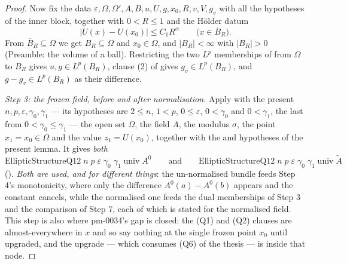 \begin{proof}
Now fix the data $\varepsilon,\Omega,\Omega',A,B,u,U,g,x_0,R,v,V,g_v$ with all
the hypotheses of the inner block, together with $0<R\le1$ and the H\"older
datum
\[
|U(x)-U(x_0)|\le C_1R^{\alpha}\qquad\bigl(x\in\overline B_R\bigr).
\tag{9.2}
\]
From $\overline B_R\subseteq\Omega$ we get $B_R\subseteq\Omega$ and
$x_0\in\Omega$, and $|B_R|<\infty$ with $|B_R|>0$ (Preamble: the volume of a
ball).  Restricting the two $L^p$ memberships of  from
$\Omega$ to $B_R$ gives $u,g\in L^p(B_R)$, clause (2) of
 gives $g_v\in L^p(B_R)$, and $g-g_v\in L^p(B_R)$ as
their difference.

\medskip
\noindent\emph{Step 3: the frozen field, before and after normalisation.}
Apply  with the present
$n,p,\varepsilon,\gamma_0,\gamma_1$ --- its hypotheses are $2\le n$, $1<p$,
$0\le\varepsilon$, $0<\gamma_0$ and $0<\gamma_1$, the last from
$0<\gamma_0\le\gamma_1$ --- the open set $\Omega$, the field $A$, the modulus
$\sigma$, the point $x_1=x_0\in\Omega$ and the value $z_1=U(x_0)$, together with
the  and  hypotheses
of the present lemma.  It gives \emph{both}
\[
\mathrm{EllipticStructureQ12}\;n\;p\;\varepsilon\;\gamma_0\;\gamma_1\;
\mathrm{univ}\;A^0
\qquad\text{and}\qquad
\mathrm{EllipticStructureQ12}\;n\;p\;\varepsilon\;\gamma_0\;\gamma_1\;
\mathrm{univ}\;\widetilde A
\]
().  \emph{Both are used, and for different
things}: the un-normalised bundle feeds Step 4's monotonicity, where only the
difference $A^0(a)-A^0(b)$ appears and the constant cancels, while the
normalised one feeds the dual memberships of Step 3 and the comparison of Step
7, each of which is stated for the normalised field.  This step is also where
pm-0034's gap is closed: the (Q1) and (Q2) clauses are almost-everywhere in $x$
and so say nothing at the single frozen point $x_0$ until upgraded, and the
upgrade --- which consumes (Q6) of the thesis --- is inside that node.


\end{proof}
